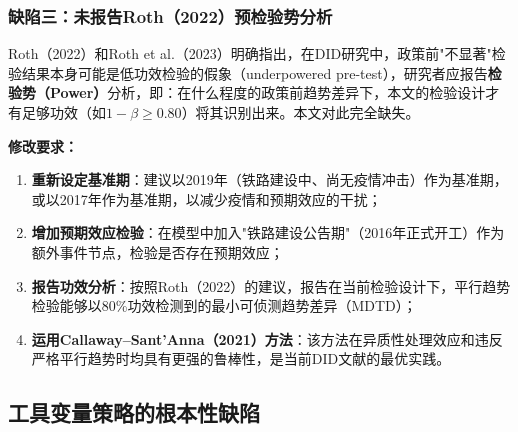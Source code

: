 \documentclass[12pt, a4paper]{article}
\begin{document}
\begin{criticalbox}
\subsubsection{缺陷三：未报告Roth（2022）预检验势分析}

Roth（2022）和Roth et al.（2023）明确指出，在DID研究中，政策前"不显著"检验结果本身可能是低功效检验的假象（underpowered pre-test），研究者应报告\textbf{检验势（Power）}分析，即：在什么程度的政策前趋势差异下，本文的检验设计才有足够功效（如$1-\beta \geq 0.80$）将其识别出来。本文对此完全缺失。

\textbf{修改要求：}
\begin{enumerate}[label=(\alph*)]
  \item \textbf{重新设定基准期}：建议以2019年（铁路建设中、尚无疫情冲击）作为基准期，或以2017年作为基准期，以减少疫情和预期效应的干扰；
  \item \textbf{增加预期效应检验}：在模型中加入"铁路建设公告期"（2016年正式开工）作为额外事件节点，检验是否存在预期效应；
  \item \textbf{报告功效分析}：按照Roth（2022）的建议，报告在当前检验设计下，平行趋势检验能够以80\%功效检测到的最小可侦测趋势差异（MDTD）；
  \item \textbf{运用Callaway--Sant'Anna（2021）方法}：该方法在异质性处理效应和违反严格平行趋势时均具有更强的鲁棒性，是当前DID文献的最优实践。
\end{enumerate}
\end{criticalbox}

\subsection{工具变量策略的根本性缺陷}
\label{sec:iv}
\end{document}
